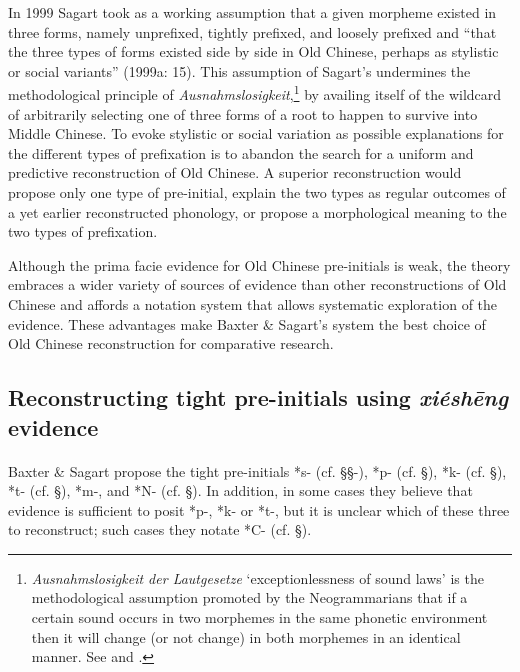 In 1999 Sagart took as a working assumption that a given morpheme
existed in three forms, namely unprefixed, tightly prefixed, and loosely
prefixed and ``that the three types of forms existed side by side in Old
Chinese, perhaps as stylistic or social variants'' (1999a: 15). This
assumption of Sagart's undermines the methodological principle of
 \emph{Ausnahmslosigkeit},\footnote{ \emph{Ausnahmslosigkeit der
  Lautgesetze} `exceptionlessness of sound laws' is the methodological
  assumption promoted by the Neogrammarians that if a certain sound
  occurs in two morphemes in the same phonetic environment then it will
  change (or not change) in both morphemes in an identical manner. See \citet{Jankowsky1972}
  and \citet{Amsterdamska1987}.} by availing itself of the
wildcard of arbitrarily selecting one of three forms of a root to happen
to survive into Middle Chinese. To evoke stylistic or social variation
as possible explanations for the different types of prefixation is to
abandon the search for a uniform and predictive re­con­struction of Old
Chinese. A superior reconstruction would propose only one type of
pre-initial, explain the two types as regular outcomes of a yet earlier
reconstructed phonology, or propose a morphological meaning to the two
types of prefixation.

Although the prima facie evidence for Old Chinese pre-initials is weak,
the theory embraces a wider variety of sources of evidence than other
reconstructions of Old Chinese and affords a notation system that allows
systematic exploration of the evidence. These advantages make Baxter \&
Sagart's system the best choice of Old Chinese reconstruction for
comparative research.

\subsection{Reconstructing tight pre-initials using
 \emph{xiéshēng}
evidence}\label{reconstructing-tight-pre-initials-using-xiuxe9shux113ng-evidence}

\paragraph{}Baxter \& Sagart propose the tight pre-initials *s- (cf. §§-), *p-
(cf. §), *k- (cf. §), *t- (cf. §), *m-, and *N- (cf. §). In addition, in
some cases they believe that evidence is sufficient to posit *p-, *k- or
*t-, but it is unclear which of these three to reconstruct; such cases
they notate *C- (cf. §).

